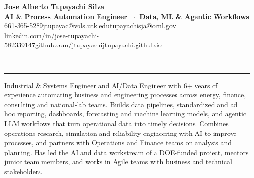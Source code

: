 \documentclass[10pt,a4paper]{extarticle}
\newif\ifteaching
\newcommand{\sep}{\hspace{0.45em}\textcolor{bul}{\textbar}\hspace{0.45em}}
\newcommand{\link}[2]{\href{#1}{#2}}
\newcommand{\sect}[2][]{\needspace{45pt}\vspace{9pt}%
  {\color{navy}\bfseries\large\textls[60]{\MakeUppercase{#2}}}{\color{muted}\small\ #1}\\[-6.5pt]
  {\color{navy}\rule{\linewidth}{0.5pt}}\par\vspace{-1pt}}
\begin{document}
\small

\begin{center}
  {\color{navy}\fontsize{22}{26}\selectfont\bfseries Jose Alberto Tupayachi Silva}\\[3pt]
  {\normalsize\bfseries \ifteaching Ph.D. Candidate, Industrial Engineering \ $\cdot$\ AI \& Data Researcher\else AI \& Process Automation Engineer \ $\cdot$\ Data, ML \& Agentic Workflows\fi}\\[3pt]
  {\color{muted}\footnotesize
  661-365-5289\sep\link{mailto:jtupayac@vols.utk.edu}{jtupayac@vols.utk.edu}\sep\link{mailto:tupayachisja@ornl.gov}{tupayachisja@ornl.gov}\\[1pt]
  \link{https://www.linkedin.com/in/jose-tupayachi-582339147}{linkedin.com/in/jose-tupayachi-582339147}\sep\link{https://github.com/jtupayachi}{github.com/jtupayachi}\sep\link{https://jtupayachi.github.io/}{jtupayachi.github.io}}
\end{center}

\sect{Summary}
\ifteaching
Industrial Engineering Ph.D. candidate at the University of Tennessee, Knoxville and researcher at Oak Ridge National Laboratory who builds AI, optimization and simulation systems for transportation, health and materials science. Teaching assistant for courses in simulation, reliability engineering and engineering management, guest lecturer on digital twins, and workshop leader on Git and research collaboration tools. Mentors students and connects engineering theory to hands-on practice, drawing on prior industry experience in data engineering and analytics. Publishes in peer-reviewed journals and conferences, with a Best Paper Award and an IISE Future Faculty Fellowship.
\else
Industrial \& Systems Engineer and AI/Data Engineer with 6+ years of experience automating business and engineering processes across energy, finance, consulting and national-lab teams. Builds data pipelines, standardized and ad hoc reporting, dashboards, forecasting and machine learning models, and agentic LLM workflows that turn operational data into timely decisions. Combines operations research, simulation and reliability engineering with AI to improve processes, and partners with Operations and Finance teams on analysis and planning. Has led the AI and data workstream of a DOE-funded project, mentors junior team members, and works in Agile teams with business and technical stakeholders.
\fi
\end{document}
